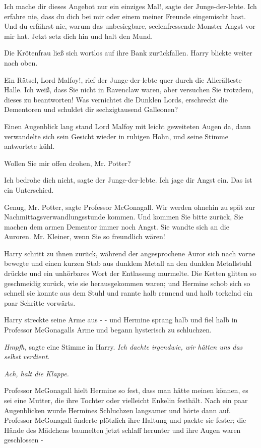 \glqq{}Ich mache dir dieses Angebot nur ein einziges Mal!\grqq{}, sagte der
Junge-der-lebte. \glqq{}Ich erfahre nie, dass du dich bei mir oder einem meiner
Freunde eingemischt hast. Und du erfährst nie, warum das unbesiegbare,
seelenfressende Monster Angst vor mir hat. Jetzt setz dich hin und halt den
Mund.\grqq{}

Die Krötenfrau ließ sich wortlos auf ihre Bank zurückfallen. Harry blickte
weiter nach oben.

\glqq{}Ein Rätsel, Lord Malfoy!\grqq{}, rief der Junge-der-lebte quer durch die
Allerälteste Halle. \glqq{}Ich weiß, dass Sie nicht in Ravenclaw waren, aber
versuchen Sie trotzdem, dieses zu beantworten! Was vernichtet die Dunklen Lords,
erschreckt die Dementoren und schuldet dir sechzigtausend Galleonen?\grqq{}

Einen Augenblick lang stand Lord Malfoy mit leicht geweiteten Augen da, dann
verwandelte sich sein Gesicht wieder in ruhigen Hohn, und seine Stimme
antwortete kühl.

\glqq{}Wollen Sie mir offen drohen, Mr. Potter?\grqq{}

\glqq{}Ich bedrohe dich nicht\grqq{}, sagte der Junge-der-lebte. \glqq{}Ich jage
dir Angst ein. Das ist ein Unterschied.\grqq{}

\glqq{}Genug, Mr. Potter\grqq{}, sagte Professor McGonagall. \glqq{}Wir werden
ohnehin zu spät zur Nachmittagsverwandlungsstunde kommen. Und kommen Sie bitte
zurück, Sie machen dem armen Dementor immer noch Angst.\grqq{} Sie wandte sich
an die Auroren. \glqq{}Mr. Kleiner, wenn Sie so freundlich wären!\grqq{}

Harry schritt zu ihnen zurück, während der angesprochene Auror sich nach vorne
bewegte und einen kurzen Stab aus dunklem Metall an den dunklen Metallstuhl
drückte und ein unhörbares Wort der Entlassung murmelte. Die Ketten glitten so
geschmeidig zurück, wie sie herausgekommen waren; und Hermine schob sich so
schnell sie konnte aus dem Stuhl und rannte halb rennend und halb torkelnd ein
paar Schritte vorwärts.

Harry streckte seine Arme aus - - und Hermine sprang halb und fiel halb in
Professor McGonagalls Arme und begann hysterisch zu schluchzen.

\emph{Hmpfh,} sagte eine Stimme in Harry. \emph{Ich dachte irgendwie, wir hätten
uns das selbst verdient.}

\emph{Ach, halt die Klappe.}

Professor McGonagall hielt Hermine so fest, dass man hätte meinen können, es sei
eine Mutter, die ihre Tochter oder vielleicht Enkelin festhält. Nach ein paar
Augenblicken wurde Hermines Schluchzen langsamer und hörte dann auf. Professor
McGonagall änderte plötzlich ihre Haltung und packte sie fester; die Hände des
Mädchens baumelten jetzt schlaff herunter und ihre Augen waren geschlossen -

